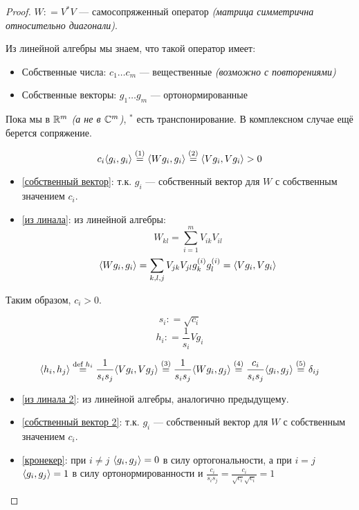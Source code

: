 \begin{proof}
    \(W : = V^* V\) --- самосопряженный оператор \textit{(матрица симметрична относительно диагонали)}.

    Из линейной алгебры мы знаем, что такой оператор имеет:
    \begin{itemize}
        \item Собственные числа: \(c_1 \dots c_m\) --- вещественные \textit{(возможно с повторениями)}
        \item Собственные векторы: \(g_1 \dots g_m\) --- ортонормированные
    \end{itemize}

    \begin{remark}
        Пока мы в \(\mathbb{R}^m\) \textit{(а не в \(\mathbb{C}^m\))}, \({}^*\) есть транспонирование. В комплексном случае ещё берется сопряжение.
    \end{remark}

    \[c_i \ev{g_i, g_i} \symrefeq{собственный вектор} \ev{W g_i, g_i} \symrefeq{из линала} \ev{V g_i, V g_i} > 0\]

    \begin{itemize}
        \item \ref{собственный вектор}: т.к. \(g_i\) --- собственный вектор для \(W\) с собственным значением \(c_i\).
        \item \ref{из линала}: из линейной алгебры:
              \[W_{kl} = \sum_{i = 1}^m V_{ik}V_{il}\]
              \[\langle W g_i, g_i\rangle = \sum_{k, l, j} V_{jk} V_{jl} g_k^{(i)} g_l^{(i)} = \langle V g_i, V g_i\rangle\]
    \end{itemize}

    Таким образом, \(c_i > 0\).

    \[s_i : = \sqrt{c_i}\]
    \[h_i : = \frac{1}{s_i} V g_i\]

    \[\ev{h_i, h_j} \defeqfor{h_i} \frac{1}{s_i s_j}\ev{V g_i, V g_j} \symrefeq{из линала 2} \frac{1}{s_i s_j}\ev{W g_i, g_j} \symrefeq{собственный вектор 2} \frac{c_i}{s_i s_j}\ev{g_i, g_j} \symrefeq{кронекер} \delta_{ij}\]

    \begin{itemize}
        \item \ref{из линала 2}: из линейной алгебры, аналогично предыдущему.
        \item \ref{собственный вектор 2}: т.к. \(g_i\) --- собственный вектор для \(W\) с собственным значением \(c_i\).
        \item \ref{кронекер}: при \(i \neq j\) \(\langle g_i, g_j\rangle = 0\) в силу ортогональности, а при \(i = j\) \(\langle g_i, g_j\rangle = 1\) в силу ортонормированности и \(\frac{c_i}{s_i s_j} = \frac{c_i}{\sqrt{c_i}\sqrt{c_i}} = 1\)
    \end{itemize}


\end{proof}
